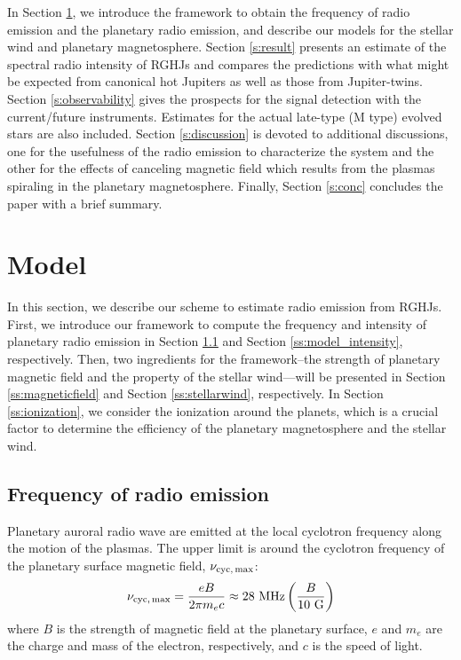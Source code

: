 \documentclass[iop,numberedappendix,apj]{emulateapj}
\begin{document}
In Section \ref{s:assumptions}, we introduce the framework to obtain the frequency of radio emission and the planetary radio emission, and describe our models for the stellar wind and planetary magnetosphere.
Section \ref{s:result} presents an estimate of the spectral radio intensity of RGHJs and compares the predictions with what might be expected from canonical hot Jupiters as well as those from Jupiter-twins.
Section \ref{s:observability} gives the prospects for the signal detection with the current/future instruments. 
Estimates for the actual late-type (M type) evolved stars are also included. 
Section \ref{s:discussion} is devoted to additional discussions, one for the usefulness of the radio emission to characterize the system and the other for the effects of canceling magnetic field which results from the plasmas spiraling in the planetary magnetosphere.  
Finally, Section \ref{s:conc} concludes the paper with a brief summary. 


\section{Model}
\label{s:assumptions}


In this section, we describe our scheme to estimate radio emission from RGHJs. 
First, we introduce our framework to compute the frequency and intensity of planetary radio emission in Section \ref{ss:model_frequency} and Section \ref{ss:model_intensity}, respectively. 
Then, two ingredients for the framework--the strength of planetary magnetic field and the property of the stellar wind---will be presented in Section \ref{ss:magneticfield} and Section \ref{ss:stellarwind}, respectively. 
In Section \ref{ss:ionization}, we consider the ionization around the planets, which is a crucial factor to determine the efficiency of the planetary magnetosphere and the stellar wind. 


\subsection{Frequency of radio emission}
\label{ss:model_frequency}

Planetary auroral radio wave are emitted at the local cyclotron frequency along the motion of the plasmas.
The upper limit is around the cyclotron frequency of the planetary surface magnetic field, $\nu_{\rm cyc,\,max}$: 
\begin{equation}
\nu_{\rm cyc,\,max} = \frac{eB}{2\pi m_e c} \approx 28 {\rm~MHz} \left( \frac{B}{10 \rm~G} \right) \label{eq:fcyc}
\end{equation}
where $B$ is the strength of magnetic field at the planetary surface, $e$ and $m_e$ are the charge and mass of the electron, respectively, and $c$ is the speed of light. 
\end{document}
